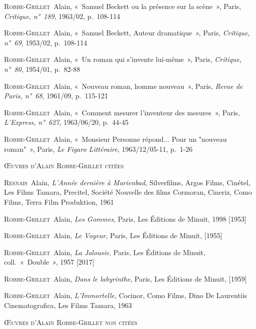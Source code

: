 \documentclass[12pt, a4paper]{article}
\begin{document}
	\textsc{Robbe-Grillet}~Alain, «~Samuel Beckett ou la présence sur la scène~», Paris, \textit{Critique, n°~189}, 1963/02, p.~108-114\par
	\textsc{Robbe-Grillet}~Alain, «~Samuel Beckett, Auteur dramatique~», Paris, \textit{Critique, n°~69}, 1953/02, p.~108-114\par
	\textsc{Robbe-Grillet}~Alain, «~Un roman qui s'invente lui-même~», Paris, \textit{Critique, n°~80}, 1954/01, p.~82-88\par
	\textsc{Robbe-Grillet}~Alain, «~Nouveau roman, homme nouveau~», Paris, \textit{Revue de Paris, n°~68}, 1961/09, p.~115-121\par
	\textsc{Robbe-Grillet}~Alain, «~Comment mesurer l'inventeur des mesures~», Paris, \textit{L'Express, n°~627}, 1963/06/20, p.~44-45\par
	\textsc{Robbe-Grillet}~Alain, «~Monsieur Personne répond... Pour un "nouveau roman"~», Paris, \textit{Le Figaro Littéraire}, 1963/12/05-11, p.~1-26\par
	
		\vspace*{2cm}
		\setlength{\parindent}{0cm}
{\large\textsc{Œuvres d'Alain Robbe-Grillet citées}}
		\vspace*{1cm}
		\setlength{\parindent}{25pt}
		
		
		

		
		\textsc{Resnais}~Alain, \textit{L'Année dernière à Marienbad}, Silverfilms, Argos Films, Cinétel, Les Films Tamara, Precitel, Société Nouvelle des films Cormoran, Cineriz, Como Films, Terra Film Produktion, 1961\par 
	\textsc{Robbe-Grillet}~Alain, \textit{Les Gommes}, Paris, Les Éditions de Minuit, 1998 [1953]\par 
	\textsc{Robbe-Grillet}~Alain, \textit{Le Voyeur}, Paris, Les Éditions de Minuit,  [1955]\par 
	\textsc{Robbe-Grillet}~Alain, \textit{La Jalousie}, Paris, Les Éditions de Minuit, coll.~«~Double~», 1957 [2017]\par 
	\textsc{Robbe-Grillet}~Alain, \textit{Dans le labyrinthe}, Paris, Les Éditions de Minuit,  [1959]\par 
	\textsc{Robbe-Grillet}~Alain, \textit{L'Immortelle}, Cocinor, Como Films, Dino De Laurentiis Cinematografica, Les Films Tamara, 1963\par 
	
		\vspace*{2cm}
		\setlength{\parindent}{0cm}
{\large\textsc{Œuvres d'Alain Robbe-Grillet non citées}}
		\vspace*{1cm}
		\setlength{\parindent}{25pt}
		
\end{document}
